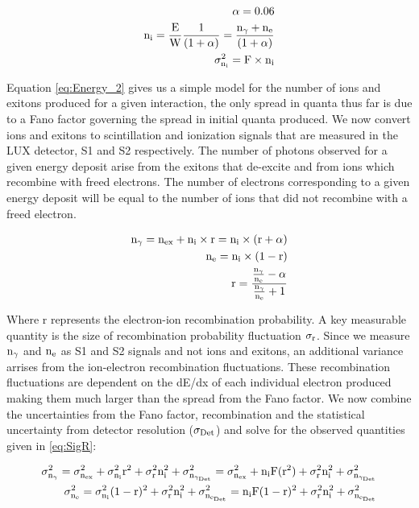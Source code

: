 \begin{equation}
\begin{split}
\rm \alpha = 0.06\\
\rm  n_i = \frac{E}{W} \frac{1}{(1+\alpha)} =  \frac{n_\gamma + n_e}{(1+\alpha)}  \\ %
\rm \sigma_{n_i}^2  = F \times n_i
\label{eq:Energy_2}
\end{split}
\end{equation}

Equation \ref{eq:Energy_2} gives us a simple model for the number of ions and exitons produced for a given interaction, the only spread in quanta thus far is due to a Fano factor governing the spread in initial quanta produced. We now convert ions and exitons to scintillation and ionization signals that are measured in the LUX detector, S1  and S2 respectively. The number of photons observed for a given energy deposit arise from the exitons that de-excite and from ions which recombine with freed electrons. The number of electrons corresponding to a given energy deposit will be equal to the number of ions that did not recombine with a freed electron. 

\begin{equation}
\begin{split}
\rm  n_\gamma = n_{ex} + n_i\times r = n_i\times (r+\alpha) \\
\rm  n_e = n_i\times (1-r)\\
\rm r= \frac{\frac{n_\gamma}{n_e}-\alpha}{\frac{n_\gamma}{n_e} + 1}
\label{eq:Quanta}
\end{split}
\end{equation}

Where r represents the electron-ion recombination probability. A key measurable quantity is the size of recombination probability fluctuation $\rm \sigma_r$. Since we measure $\rm n_\gamma$ and $\rm n_e$ as S1 and S2 signals and not ions and exitons, an additional variance arrises from the ion-electron recombination fluctuations. These recombination fluctuations are dependent on the dE/dx of each individual electron produced making them much larger than the spread from the Fano factor. We now combine the uncertainties from the Fano factor, recombination and the statistical uncertainty from detector resolution ($\rm\sigma_{Det}$) and solve for the observed quantities given in \ref{eq:SigR}:

\begin{equation}
\begin{split}
\rm \sigma_{n_\gamma}^2  =\sigma_{n_{ex}}^2 + \sigma_{n_i}^2 r^2 +  \sigma_{r}^2 n_i^2 +\sigma_{n_{\gamma_{Det}}}^2 = \sigma_{n_{ex}}^2 + n_iF(r^2) + \sigma_{r}^2 n_i^2 + \sigma_{n_{\gamma_{Det}}}^2 \\
\rm \sigma_{n_e}^2  = \sigma_{n_i}^2 (1-r)^2 +  \sigma_{r}^2 n_i^2 +\sigma_{n_{e_{Det}}}^2= n_iF(1-r)^2+ \sigma_{r}^2 n_i^2 +\sigma_{n_{e_{Det}}}^2
\label{eq:SigR}
\end{split}
\end{equation}


